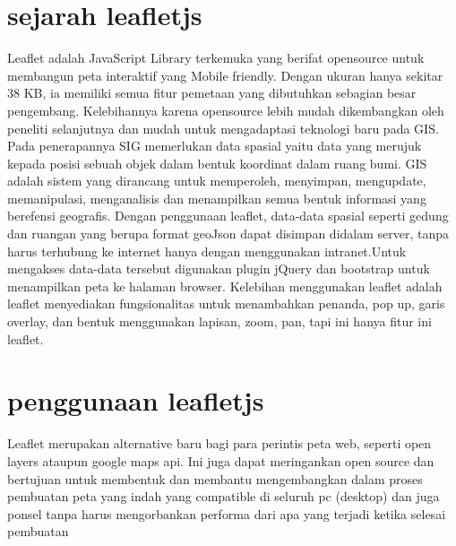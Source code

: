  
 
 
 \section{sejarah leafletjs}
        Leaflet adalah JavaScript Library terkemuka yang berifat opensource untuk membangun peta interaktif yang Mobile friendly. Dengan ukuran hanya sekitar 38 KB, ia memiliki semua fitur pemetaan yang dibutuhkan sebagian besar pengembang.
    Kelebihannya karena opensource lebih mudah dikembangkan oleh peneliti selanjutnya dan mudah untuk mengadaptasi teknologi baru pada GIS. Pada penerapannya SIG memerlukan data spasial yaitu data yang merujuk kepada posisi sebuah objek dalam bentuk koordinat dalam ruang bumi. GIS adalah sistem yang dirancang untuk memperoleh, menyimpan, mengupdate, memanipulasi, menganalisis dan menampilkan semua bentuk informasi yang berefensi geografis.
Dengan penggunaan leaflet, data-data spasial seperti gedung dan ruangan yang berupa format geoJson dapat disimpan didalam server, tanpa harus terhubung ke internet hanya dengan menggunakan intranet.Untuk mengakses data-data tersebut digunakan plugin jQuery dan bootstrap untuk menampilkan peta ke halaman browser. Kelebihan menggunakan leaflet adalah leaflet menyediakan fungsionalitas untuk menambahkan penanda, pop up, garis overlay, dan bentuk menggunakan lapisan, zoom, pan, tapi ini hanya fitur ini leaflet.

\section{penggunaan leafletjs}
Leaflet merupakan alternative baru bagi para perintis peta web, seperti open layers ataupun google maps api. Ini juga dapat meringankan open source dan bertujuan untuk membentuk dan membantu mengembangkan dalam proses pembuatan peta yang indah yang compatible di seluruh pc (desktop) dan juga ponsel tanpa harus mengorbankan performa dari apa yang terjadi ketika selesai pembuatan


